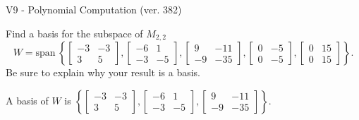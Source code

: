 \begin{exercise}
  \begin{exerciseTitle}V9 - Polynomial Computation (ver. 382)\end{exerciseTitle}
  \begin{exerciseStatement}
    Find a basis for the subspace of \(M_{2,2}\) 
\[W=\mathrm{span}\ \left\{\left[\begin{array}{cc}
-3 & -3 \\
3 & 5
\end{array}\right] , \left[\begin{array}{cc}
-6 & 1 \\
-3 & -5
\end{array}\right] , \left[\begin{array}{cc}
9 & -11 \\
-9 & -35
\end{array}\right] , \left[\begin{array}{cc}
0 & -5 \\
0 & -5
\end{array}\right] , \left[\begin{array}{cc}
0 & 15 \\
0 & 15
\end{array}\right]\right\}.\]
 Be sure to explain why your result is a basis.


  \end{exerciseStatement}
  \begin{exerciseAnswer}
   A basis of \(W\) is  \(\left\{\left[\begin{array}{cc}
-3 & -3 \\
3 & 5
\end{array}\right] , \left[\begin{array}{cc}
-6 & 1 \\
-3 & -5
\end{array}\right] , \left[\begin{array}{cc}
9 & -11 \\
-9 & -35
\end{array}\right]\right\}\).
  


  \end{exerciseAnswer}
\end{exercise}
